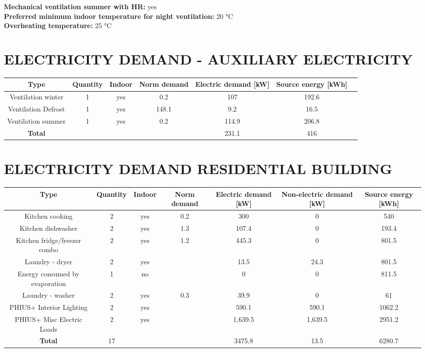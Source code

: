 \documentclass{article}
\begin{document}
\medskip

\textbf{Mechanical ventilation summer with HR:} yes \\
\textbf{Preferred minimum indoor temperature for night ventilation:} 20 °C \\
\textbf{Overheating temperature:} 25 °C \\


\section*{ELECTRICITY DEMAND - AUXILIARY ELECTRICITY}
\begin{tabular}{@{}ccccccc@{}}
\toprule
Type & Quantity & Indoor & Norm demand & Electric demand [kW] & Source energy [kWh] \\ \midrule
Ventilation winter & 1 & yes & 0.2 & 107 & 192.6 \\
Ventilation Defrost & 1 & yes & 148.1 & 9.2 & 16.5 \\
Ventilation summer & 1 & yes & 0.2 & 114.9 & 206.8 \\ \midrule
\textbf{Total} & & & & 231.1 & 416 \\ \bottomrule
\end{tabular}

\vspace{1cm}

\section*{ELECTRICITY DEMAND RESIDENTIAL BUILDING}
\begin{tabular}{@{}ccccccc@{}}
\toprule
Type & Quantity & Indoor & Norm demand & Electric demand [kW] & Non-electric demand [kW] & Source energy [kWh] \\ \midrule
Kitchen cooking & 2 & yes & 0.2 & 300 & 0 & 540 \\
Kitchen dishwasher & 2 & yes & 1.3 & 107.4 & 0 & 193.4 \\
Kitchen fridge/freezer combo & 2 & yes & 1.2 & 445.3 & 0 & 801.5 \\
Laundry - dryer & 2 & yes & & 13.5 & 24.3 & 801.5 \\
Energy consumed by evaporation & 1 & no & & 0 & 0 & 811.5 \\
Laundry - washer & 2 & yes & 0.3 & 39.9 & 0 & 61 \\
PHIUS+ Interior Lighting & 2 & yes & & 590.1 & 590.1 & 1062.2 \\
PHIUS+ Misc Electric Loads & 2 & yes & & 1,639.5 & 1,639.5 & 2951.2 \\ \midrule
\textbf{Total} & 17 & & & 3475.8 & 13.5 & 6280.7 \\ \bottomrule
\end{tabular}
\end{document}
